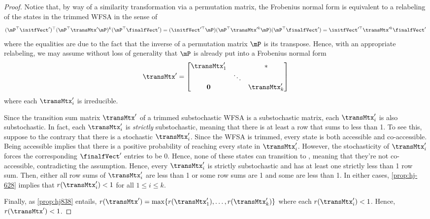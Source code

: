 \begin{proof}
Notice that, by way of a similarity transformation via a permutation matrix, the Frobenius normal form is equivalent to a relabeling of the states in the trimmed WFSA in the sense of
\begin{align}
    (\mP^\top\initfVect')^\top (\mP^\top \transMtx' \mP)^k (\mP^\top\finalfVect') 
    = (\initfVect'^\top \mP) (\mP^\top \transMtx'^k \mP)(\mP^\top \finalfVect') 
    = \initfVect'^\top \transMtx'^k \finalfVect'
\end{align}
where the equalities are due to the fact that the inverse of a permutation matrix $\mP$ is its transpose. Hence, with an appropriate relabeling, we may assume without loss of generality that $\mP$ is already put into a Frobenius normal form
\begin{align}
    \transMtx' = \begin{bmatrix}
        \transMtx'_1 &  & \ast \\
        & \ddots & \\
        \mathbf{0} & & \transMtx'_k
    \end{bmatrix}
\end{align}
where each $\transMtx'_i$ is irreducible.

Since the transition sum matrix $\transMtx'$ of a trimmed substochastic WFSA is a substochastic matrix, each $\transMtx'_i$ is also substochastic. In fact, each $\transMtx'_i$ is \emph{strictly} substochastic, meaning that there is at least a row that sums to less than 1. To see this, suppose to the contrary that there is a stochastic $\transMtx'_i$. Since the WFSA is trimmed, every state is both accessible and co-accessible. Being accessible implies that there is a positive probability of reaching every state in $\transMtx'_i$. However, the stochasticity of $\transMtx'_i$ forces the corresponding $\finalfVect'$ entries to be 0. Hence, none of these states can transition to \eos, meaning that they're not co-accessible, contradicting the assumption. Hence, every $\transMtx'_i$ is strictly substochastic and has at least one strictly less than 1 row sum. Then, either all row sums of $\transMtx'_i$ are less than 1 or some row sums are 1 and some are less than 1. In either cases, \cref{prop:hj-628} implies that $r(\transMtx'_i)<1$ for all $1\leq i\leq k$.

Finally, as \cref{prop:hj838} entails, $r(\transMtx')=\max\{r(\transMtx'_1),\dots,r(\transMtx'_k)\}$ where each $r(\transMtx'_i)<1$. Hence, $r(\transMtx')<1$.
\end{proof}

